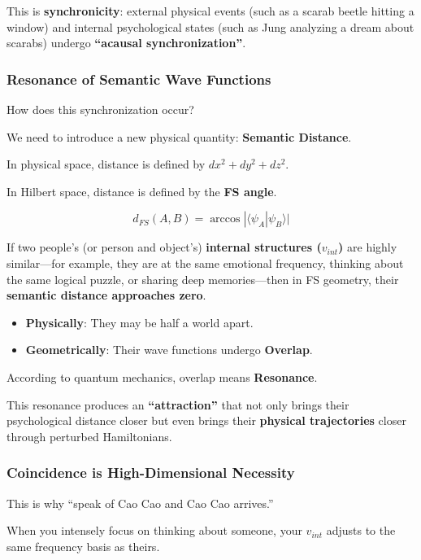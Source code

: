 This is \textbf{synchronicity}: external physical events (such as a scarab beetle hitting a window) and internal psychological states (such as Jung analyzing a dream about scarabs) undergo \textbf{``acausal synchronization''}.

\subsubsection{Resonance of Semantic Wave Functions}

How does this synchronization occur?

We need to introduce a new physical quantity: \textbf{Semantic Distance}.

In physical space, distance is defined by $dx^2 + dy^2 + dz^2$.

In Hilbert space, distance is defined by the \textbf{FS angle}.

\[d_{FS}(A, B) = \arccos |\langle \psi_A | \psi_B \rangle|\]

If two people's (or person and object's) \textbf{internal structures ($v_{int}$)} are highly similar---for example, they are at the same emotional frequency, thinking about the same logical puzzle, or sharing deep memories---then in FS geometry, their \textbf{semantic distance approaches zero}.

\begin{itemize}
\item \textbf{Physically}: They may be half a world apart.

\item \textbf{Geometrically}: Their wave functions undergo \textbf{Overlap}.
\end{itemize}

According to quantum mechanics, overlap means \textbf{Resonance}.

This resonance produces an \textbf{``attraction''} that not only brings their psychological distance closer but even brings their \textbf{physical trajectories} closer through perturbed Hamiltonians.

\subsubsection{Coincidence is High-Dimensional Necessity}

This is why ``speak of Cao Cao and Cao Cao arrives.''

When you intensely focus on thinking about someone, your $v_{int}$ adjusts to the same frequency basis as theirs.

